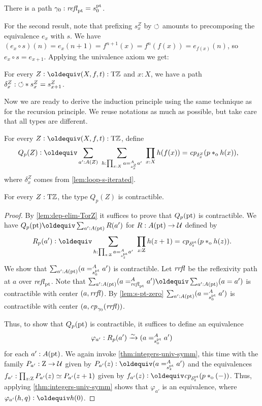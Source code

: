 \documentclass[a4paper,12pt]{amsart}
\begin{document}
\begin{lemma}\label{lem:s-pt-zero}
  There is a path $\gamma_0 : \mathop{{\it refl}_{{\mathord{\mathrm{pt}}}}} = s^{\mathord{\mathrm{pt}}}_0$. 
\end{lemma}

For the second result, note that prefixing $s^Z_x$ by ${\circlearrowleft}$ 
amounts to precomposing the equivalence $e_x$ with $s$. 
We have $(e_x\circ s)(n) = e_x(n+1) = f^{n+1}(x) = f^n(f(x)) =e_{f(x)}(n)$,
so $e_x\circ s = e_{x+1}$. Applying the univalence axiom we get:

\begin{lemma}\label{lem:loop-s-iterated}
  For every $Z\defeq(X,f,t):\TorZ$ and $x:X$, we have a path
  ${\delta^Z_x}: {\circlearrowleft} * s^Z_x = s^Z_{x+1}$. 
\end{lemma}

Now we are ready to derive the induction principle using the same 
technique as for the recursion principle. We reuse notations as much as
possible, but take care that all types are different.

\begin{definition}\label{def:guided-null-hmtps-dep}
For every $Z\defeq(X,f,t):\TorZ$, define
\begin{align*}\label{eq:TBD}
Q_p(Z)&\defeq \sum_{a' : A(Z)}~\sum_{h : \prod_{x:X} a =^A_{s^Z_x} a'}~\prod_{x:X} h(f(x)) = \cp{\delta^Z_x}(p\cto h(x)),
\end{align*}
where $\delta^Z_x$ comes from \cref{lem:loop-s-iterated}.
\end{definition}


\begin{lemma}\label{lem:guided-null-hmtps-dep}
  For every $Z:{\mathrm{T}\mathbb{Z}}$, the type $Q_p(Z)$ is contractible.
\end{lemma}
\begin{proof}
  By \cref{lem:dep-elim-TorZ} it suffices to prove that $Q_p({\mathord{\mathrm{pt}}})$ is contractible.
  We have $Q_p(\pt)\jdeq \sum_{a':A(\pt)} R(a')$ for $R : A({\mathord{\mathrm{pt}}}) \to \mathcal{U}$ defined by
  \[
    R_p(a') \defeq \sum_{h : \prod_{z:\zet} a =^A_{s^\pt_z} a'}~
    \prod_{z:\zet} h(z+1) = \cp{\delta^\pt_z}(p \cto h(z)).
  \]
  We show that $\sum_{a':A({\mathord{\mathrm{pt}}})} (a =^A_{s^{\mathord{\mathrm{pt}}}_0} {a'})$ is contractible.
  Let $\mathit{rrfl}$ be the reflexivity path at $a$ over $\mathop{{\it refl}_{{\mathord{\mathrm{pt}}}}}$.
  Note that $\sum_{a':A(\pt)} (a =^A_{\refl{\pt}} a') \jdeq \sum_{a':A(\pt)} (a = a')$
  is contractible with center $(a,\mathit{rrfl})$. By \cref{lem:s-pt-zero}
  $\sum_{a':A({\mathord{\mathrm{pt}}})} (a =^A_{s^{\mathord{\mathrm{pt}}}_0} {a'})$ is contractible with center
  $(a,\mathit{cp}_{\gamma_0}(\mathit{rrfl}))$.

  Thus, to show that $Q_p({\mathord{\mathrm{pt}}})$ is contractible,
  it suffices to define an equivalence
  \[
    \varphi_{a'} : R_p(a') \xrightarrow{\sim}{} (a =^A_{s^{\mathord{\mathrm{pt}}}_0} {a'})
  \]
  for each $a' : A({\mathord{\mathrm{pt}}})$.
  We again invoke \cref{thm:integers-univ-symm},
  this time with the family $P_{a'} : \mathrm{Z} \to \mathcal{U}$ given 
  by $P_{a'}(z) \defeq (a =^A_{s^\pt_z} {a'})$
  and the equivalences $f_{a'} : \prod_{z:\mathrm{Z}} P_{a'}(z)\simeq P_{a'}(z+1)$ 
  given by $f_{a'}(z) \defeq \cp{\delta^\pt_z}(p \cto ({-}))$.
  Thus, applying \cref{thm:integers-univ-symm}
  shows that $\varphi_{a'}$ is an equivalence,
  where $\varphi_{a'}(h,q) \defeq h(0)$.
\end{proof}
\end{document}
